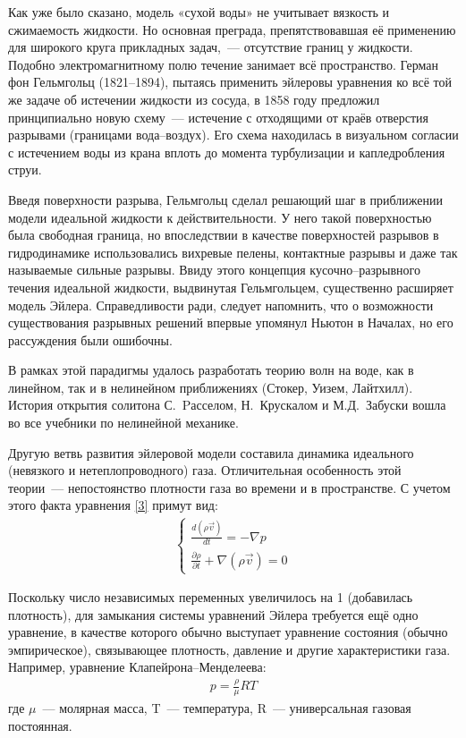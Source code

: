 Как уже было сказано, модель «сухой воды» не учитывает вязкость и сжимаемость жидкости. Но основная преграда, 
препятствовавшая её применению для широкого круга прикладных задач,~--- отсутствие границ у жидкости. Подобно 
электромагнитному полю течение занимает всё пространство. Герман фон Гельмгольц (1821--1894), пытаясь применить 
эйлеровы уравнения ко всё той же задаче об истечении жидкости из сосуда, в 1858 году предложил принципиально новую 
схему~--- истечение с отходящими от краёв отверстия разрывами (границами вода--воздух). Его схема находилась в 
визуальном согласии с истечением воды из крана вплоть до момента турбулизации и капледробления струи.

Введя поверхности разрыва, Гельмгольц сделал решающий шаг в приближении модели идеальной жидкости к действительности. 
У него такой поверхностью была свободная граница, но впоследствии в качестве поверхностей разрывов в гидродинамике 
использовались вихревые пелены, контактные разрывы и даже так называемые сильные разрывы. Ввиду этого концепция 
кусочно--разрывного течения идеальной жидкости, выдвинутая Гельмгольцем, существенно расширяет модель Эйлера. 
Справедливости ради, следует напомнить, что о возможности существования разрывных решений впервые упомянул Ньютон 
в Началах, но его рассуждения были ошибочны.

В рамках этой парадигмы удалось разработать теорию волн на воде, как в линейном, так и в нелинейном приближениях 
(Стокер, Уизем, Лайтхилл). История открытия солитона С.~Pасселом, Н.~Крускалом и М.Д.~Забуски вошла во все 
учебники по нелинейной механике.

Другую ветвь развития эйлеровой модели составила динамика идеального (невязкого и нетеплопроводного) газа. 
Отличительная особенность этой теории~--- непостоянство плотности газа во времени и в пространстве. С учетом 
этого факта уравнения \ref{3} примут вид:
\begin{gather}
\begin{cases}
\frac{d (\rho \vec v)}{d t} = - \nabla p \\
\frac{\partial \rho }{\partial t} + \nabla (\rho \vec v) = 0
\end{cases}
\label{4}
\end{gather}

Поскольку число независимых переменных увеличилось на 1 (добавилась плотность), для замыкания системы уравнений 
Эйлера требуется ещё одно уравнение, в качестве которого обычно выступает уравнение состояния (обычно эмпирическое),
связывающее плотность, давление и другие характеристики газа. Например, уравнение Клапейрона--Менделеева:
\begin{gather}
p = \frac{\rho}{\mu}RT
\label{5}
\end{gather}
где $\mu$~--- молярная масса, T~--- температура, R~--- универсальная газовая постоянная.

